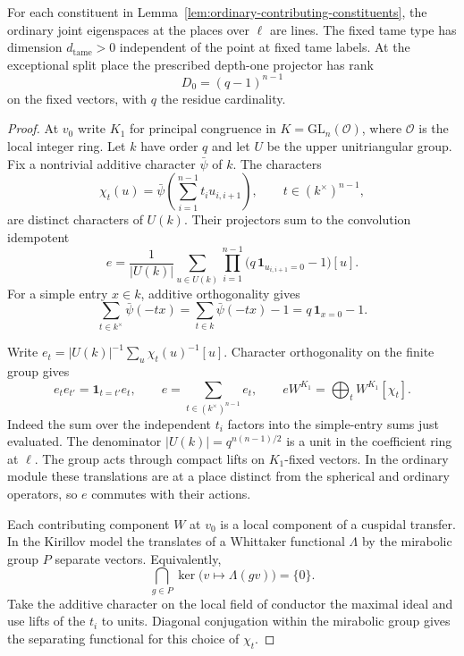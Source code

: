 \begin{proposition}
\label{prop:ordinary-three-local-dimensions}
For each constituent in Lemma~\ref{lem:ordinary-contributing-constituents}, the ordinary joint
eigenspaces at the places over \(\ell\) are lines. The fixed tame
type has dimension \(d_{\mathrm{tame}}>0\) independent of the point
at fixed tame labels. At the exceptional split place the prescribed
depth-one projector has rank 
\[
 D_0=(q-1)^{n-1}
\]
 on the fixed
vectors, with \(q\) the residue cardinality.
\end{proposition}

\begin{proof}
At \(v_0\) write \(K_1\) for principal congruence in
\(K=\mathrm{GL}_n(\mathcal O)\), where \(\mathcal O\)
is the local integer ring. Let \(k\) have order \(q\)
and let \(U\) be the upper unitriangular group. Fix a
nontrivial additive character \(\bar\psi\) of \(k\).
The characters
\[
  \chi_t(u)=\bar\psi\!\left(\sum_{i=1}^{n-1}t_i u_{i,i+1}\right),
  \qquad t\in(k^\times)^{n-1},
\]
are distinct characters of \(U(k)\). Their projectors
sum to the convolution idempotent
\[
 e=\frac{1}{|U(k)|}\sum_{u\in U(k)}
    \prod_{i=1}^{n-1}\bigl(q\,\mathbf{1}_{u_{i,i+1}=0}-1\bigr)[u].
\]
For a simple entry \(x\in k\), additive orthogonality gives
\[
 \sum_{t\in k^\times}\bar\psi(-tx)
 =\sum_{t\in k}\bar\psi(-tx)-1=q\,\mathbf{1}_{x=0}-1.
\]

Write \(e_t=|U(k)|^{-1}\sum_u\chi_t(u)^{-1}[u]\).
Character orthogonality on the finite group gives
\begin{equation}\label{eq:depth-one-projector-splitting}
 e_t e_{t'}=\mathbf 1_{t=t'}e_t,\qquad
 e=\sum_{t\in(k^\times)^{n-1}}e_t,\qquad
 eW^{K_1}=\bigoplus_t W^{K_1}[\chi_t].
\end{equation}
Indeed the sum over the independent \(t_i\) factors into the simple-entry
sums just evaluated. The denominator \(|U(k)|=q^{n(n-1)/2}\) is
a unit in the coefficient ring at \(\ell\). The group acts through compact
lifts on \(K_1\)-fixed vectors. In the ordinary module
these translations are at a place distinct from the
spherical and ordinary operators, so \(e\) commutes
with their actions.

Each contributing component \(W\) at \(v_0\) is a
local component of a cuspidal transfer. In the Kirillov model the translates of a Whittaker functional \(\Lambda\) by the mirabolic group \(P\) separate vectors. Equivalently,
\[
 \bigcap_{g\in P}\ker\bigl(v\mapsto\Lambda(gv)\bigr)=\{0\}.
\]
\cite[\S5.2 and Corollary 8.2]{zelevinsky}
Take the additive character on the local field of
conductor the maximal ideal and use lifts of the
\(t_i\) to units. Diagonal conjugation within the
mirabolic group gives the separating functional
for this choice of \(\chi_t\).


\end{proof}
